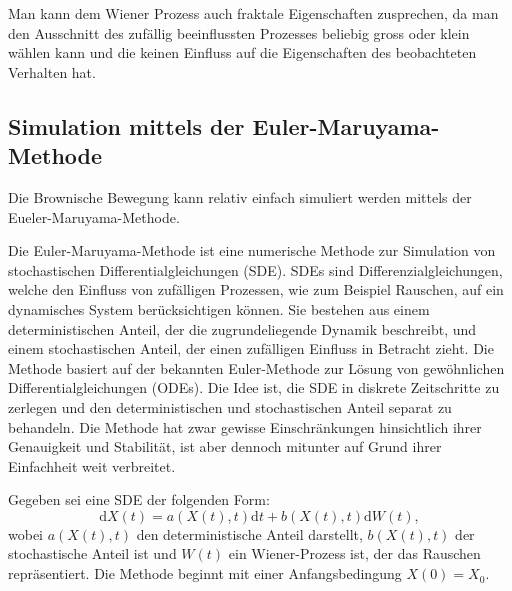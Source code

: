 

Man kann dem Wiener Prozess auch fraktale Eigenschaften zusprechen, da man den Ausschnitt des zufällig beeinflussten Prozesses beliebig gross oder klein wählen kann und die keinen Einfluss auf die Eigenschaften des beobachteten Verhalten hat.


\subsection{Simulation mittels der Euler-Maruyama-Methode
\label{brown:Simulation}}

Die Brownische Bewegung kann relativ einfach simuliert werden mittels der Eueler-Maruyama-Methode.

Die Euler-Maruyama-Methode ist eine numerische Methode zur Simulation von stochastischen Differentialgleichungen (SDE). SDEs sind Differenzialgleichungen, welche den Einfluss von zufälligen Prozessen, wie zum Beispiel Rauschen, auf ein dynamisches System berücksichtigen können. Sie bestehen aus einem deterministischen Anteil, der die zugrundeliegende Dynamik beschreibt, und einem stochastischen Anteil, der einen zufälligen Einfluss in Betracht zieht. Die Methode basiert auf der bekannten Euler-Methode zur Lösung von gewöhnlichen Differentialgleichungen (ODEs). Die Idee ist, die SDE in diskrete Zeitschritte zu zerlegen und den deterministischen und stochastischen Anteil separat zu behandeln. Die Methode hat zwar gewisse Einschränkungen hinsichtlich ihrer Genauigkeit und Stabilität, ist aber dennoch mitunter auf Grund ihrer Einfachheit weit verbreitet.

Gegeben sei eine SDE der folgenden Form:
\begin{equation}
	\mathrm{d}X(t) = a(X(t), t) \mathrm{d}t + b(X(t), t) \mathrm{d}W(t),
\end{equation}
wobei $ a(X(t), t) $ den deterministische Anteil darstellt, $ b(X(t), t) $ der stochastische Anteil ist und $ W(t) $ ein Wiener-Prozess ist, der das Rauschen repräsentiert. Die Methode beginnt mit einer Anfangsbedingung $X(0) = X_0$.


